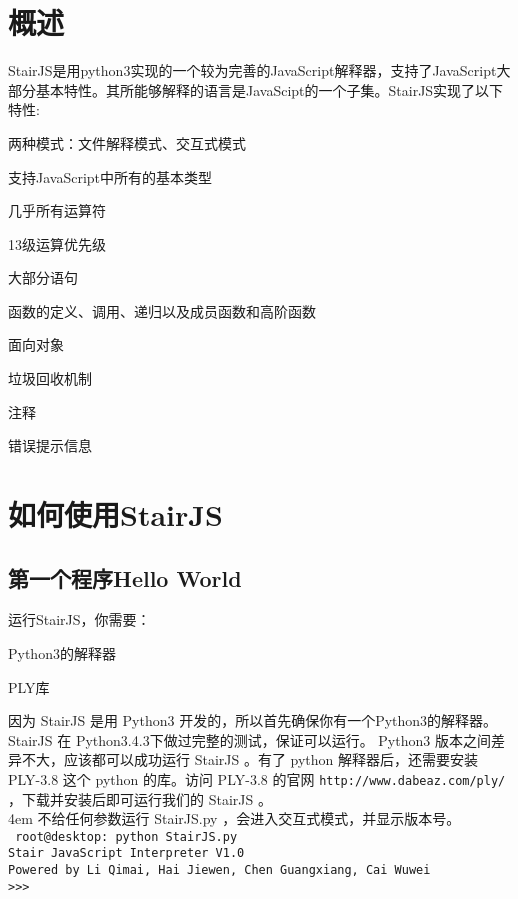 \documentclass[a4paper]{article}
\newcounter{rowno}
\begin{document}
\begin{CJK}{UTF8}{gbsn}
\section{概述}
    StairJS是用python3实现的一个较为完善的JavaScript解释器，支持了JavaScript大部分基本特性。其所能够解释的语言是JavaScipt的一个子集。StairJS实现了以下特性:
    \setcounter{rowno}{0}
    \begin{list}{\therowno.}{\setlength{\rightmargin}{\leftmargin}}
        \item 两种模式：文件解释模式、交互式模式 
        \item 支持JavaScript中所有的基本类型 
        \item 几乎所有运算符 
        \item 13级运算优先级 
        \item 大部分语句 
        \item 函数的定义、调用、递归以及成员函数和高阶函数 
        \item 面向对象 
        \item 垃圾回收机制 
        \item 注释 
        \item 错误提示信息
    \end{list}
\section{如何使用StairJS}
    \subsection{第一个程序Hello World}
        运行StairJS，你需要：
        \setcounter{rowno}{0}
        \begin{list}{\therowno.}{\setlength{\rightmargin}{\leftmargin}}
            \item Python3的解释器
            \item PLY库
        \end{list}
        因为 StairJS 是用 Python3 开发的，所以首先确保你有一个Python3的解释器。StairJS 在 Python3.4.3下做过完整的测试，保证可以运行。 Python3 版本之间差异不大，应该都可以成功运行 StairJS 。有了 python 解释器后，还需要安装 PLY-3.8 这个 python 的库。访问 PLY-3.8 的官网 {\tt http://www.dabeaz.com/ply/} ，下载并安装后即可运行我们的 StairJS 。\\

        \hangindent 4em
        不给任何参数运行 StairJS.py ，会进入交互式模式，并显示版本号。\\
        {\tt 
            root@desktop: python StairJS.py\\
            Stair JavaScript Interpreter V1.0\\
            Powered by Li Qimai, Hai Jiewen, Chen Guangxiang, Cai Wuwei\\
            >>>\\
        }


\end{CJK}
\end{document}
